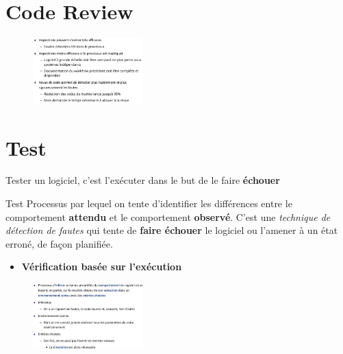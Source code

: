 \documentclass[16pt]{report}
\begin{document}
\begin{multicols*}{2}
       \section{Code Review}


       \begin{figure}[H]
        \begin{center}
            \includegraphics[width=0.38\textwidth]{CodeReview}
        \end{center}
       \end{figure}


       \section{Test}


       \begin{note}{}{}
           Tester un logiciel, c’est l’exécuter dans le but 
           de le faire \textbf{échouer}
       \end{note}


       \begin{Definitionx}{Test}{}
           Processus par lequel on tente d'identifier les différences entre 
           le comportement \textbf{attendu} et le comportement \textbf{observé}. C'est une 
           \textit{technique de détection de fautes} qui tente de \textbf{faire échouer}     
           le logiciel ou l'amener à un état erroné, de façon planifiée. 
       \end{Definitionx}

       \begin{itemize}
        \item \textbf{Vérification basée sur l'exécution}  
       \end{itemize}

       \begin{figure}[H]
        \begin{center}
            \includegraphics[width=0.38\textwidth]{Verif.png}
        \end{center}
       \end{figure}


\end{multicols*}
\end{document}
